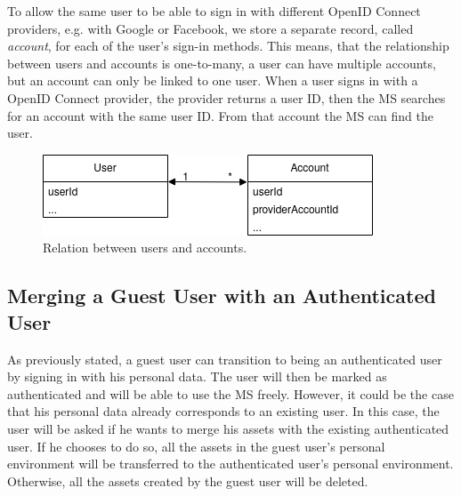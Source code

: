 To allow the same user to be able to sign in with different OpenID Connect providers, e.g. with
Google or Facebook,
we store a separate record, called \textit{account}, for each of the user's sign-in methods.
This means, that the relationship between users and accounts is one-to-many,
a user can have multiple accounts, but an account can only be linked to one user.
When a user signs in with a  OpenID Connect provider, the provider returns a user ID, 
then the MS searches for an account with the same user ID.
From that account the MS can find the user.

\begin{figure}[H]
	\centering
	\includegraphics[scale=0.6]{images/users-accounts-relation.drawio.png}
	\caption{Relation between users and accounts.}
	\vspace{-1em} %
\end{figure}

\subsection{Merging a Guest User with an Authenticated User}
\label{cha:conceptanddesign:users:mergeguestuser}

As previously stated, a guest user can transition to being an authenticated user by
signing in with his personal data.
The user will then be marked as authenticated and will be able to use the MS freely.
However, it could be the case that his personal data already corresponds to an existing user.
In this case, the user will be asked if he wants to merge his assets with the existing
authenticated user.
If he chooses to do so, all the assets in the guest user's personal environment will be
transferred to the authenticated user's personal environment.
Otherwise, all the assets created by the guest user will be deleted.


